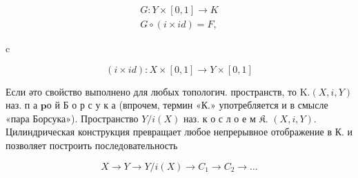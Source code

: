 \documentclass[10pt]{article}
\begin{document}
\[

\begin{gathered}

G: Y \times[0,1] \rightarrow K \\

G \circ(i \times i d)=F,

\end{gathered}

\]



c



\[

(i \times i d): X \times[0,1] \rightarrow Y \times[0,1]

\]



Если әто свойство выполнено для любых топологич. пространств, то $\mathrm{K} .(X, i, Y)$ наз. п а $\mathbf{p} о$ й Б о р с у к а (впрочем, термин «К.» употребляется и в смысле «пара Борсука»). Пространство $Y / i(X)$ наз. к о с л о е м $\mathfrak{K}$. $(X, i, Y)$. Цилиндрическая конструкция превращает любое непрерывное отображение в К. и позволяет построить последовательность



\[

X \rightarrow Y \rightarrow Y / i(X) \rightarrow C_{1} \rightarrow C_{2} \rightarrow \ldots

\]
\end{document}
